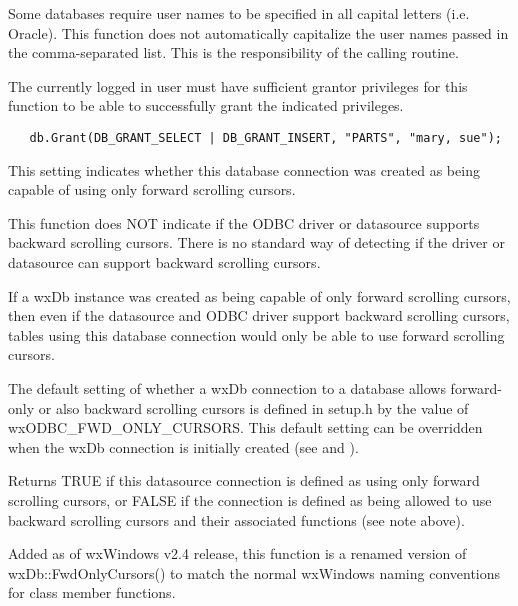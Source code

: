 
Some databases require user names to be specified in all capital letters (i.e. Oracle).  This function does not automatically capitalize the user names passed in the comma-separated list.  This is the responsibility of the calling routine.

The currently logged in user must have sufficient grantor privileges for this
function to be able to successfully grant the indicated privileges.


\begin{verbatim}
   db.Grant(DB_GRANT_SELECT | DB_GRANT_INSERT, "PARTS", "mary, sue");
\end{verbatim}

\label{wxdbisfwdonlycursors}


This setting indicates whether this database connection was created
as being capable of using only forward scrolling cursors.

This function does NOT indicate if the ODBC driver or datasource supports
backward scrolling cursors.  There is no standard way of detecting if the
driver or datasource can support backward scrolling cursors.

If a wxDb instance was created as being capable of only forward scrolling
cursors, then even if the datasource and ODBC driver support backward
scrolling cursors, tables using this database connection would only be able
to use forward scrolling cursors.

The default setting of whether a wxDb connection to a database allows
forward-only or also backward scrolling cursors is defined in setup.h by the
value of wxODBC\_FWD\_ONLY\_CURSORS.  This default setting can be overridden
when the wxDb connection is initially created (see
 and ).


Returns TRUE if this datasource connection is defined as using only forward
scrolling cursors, or FALSE if the connection is defined as being allowed to
use backward scrolling cursors and their associated functions (see note above).


Added as of wxWindows v2.4 release, this function is a renamed version of
wxDb::FwdOnlyCursors() to match the normal wxWindows naming conventions for
class member functions.

